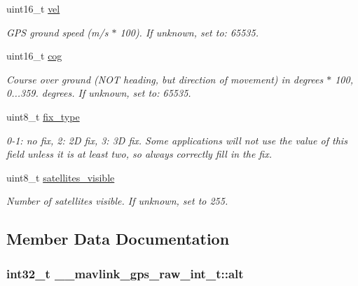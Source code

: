 \begin{DoxyCompactItemize}
uint16\+\_\+t \hyperlink{struct____mavlink__gps__raw__int__t_a77e8cbdbf554637e4fbbdaaabd562eaf}{vel}
\begin{DoxyCompactList}\small\item\em G\+P\+S ground speed (m/s $\ast$ 100). If unknown, set to\+: 65535. \end{DoxyCompactList}\item 
uint16\+\_\+t \hyperlink{struct____mavlink__gps__raw__int__t_adbe4dfbea17d1fd08a0841ce29e32637}{cog}
\begin{DoxyCompactList}\small\item\em Course over ground (N\+O\+T heading, but direction of movement) in degrees $\ast$ 100, 0...359. degrees. If unknown, set to\+: 65535. \end{DoxyCompactList}\item 
\hypertarget{struct____mavlink__gps__raw__int__t_ae014afb6eea2b6033ebde37c79e120f2}{uint8\+\_\+t \hyperlink{struct____mavlink__gps__raw__int__t_ae014afb6eea2b6033ebde37c79e120f2}{fix\+\_\+type}}\label{struct____mavlink__gps__raw__int__t_ae014afb6eea2b6033ebde37c79e120f2}

\begin{DoxyCompactList}\small\item\em 0-\/1\+: no fix, 2\+: 2\+D fix, 3\+: 3\+D fix. Some applications will not use the value of this field unless it is at least two, so always correctly fill in the fix. \end{DoxyCompactList}\item 
\hypertarget{struct____mavlink__gps__raw__int__t_af1481a191aa3ffbf832dc3a4c35cbf09}{uint8\+\_\+t \hyperlink{struct____mavlink__gps__raw__int__t_af1481a191aa3ffbf832dc3a4c35cbf09}{satellites\+\_\+visible}}\label{struct____mavlink__gps__raw__int__t_af1481a191aa3ffbf832dc3a4c35cbf09}

\begin{DoxyCompactList}\small\item\em Number of satellites visible. If unknown, set to 255. \end{DoxyCompactList}\end{DoxyCompactItemize}


\subsection{Member Data Documentation}
\hypertarget{struct____mavlink__gps__raw__int__t_a00fe92144cfdaf8440a841493e5b6e99}{
\subsubsection[{alt}]{\setlength{\rightskip}{0pt plus 5cm}int32\+\_\+t \+\_\+\+\_\+mavlink\+\_\+gps\+\_\+raw\+\_\+int\+\_\+t\+::alt}}\label{struct____mavlink__gps__raw__int__t_a00fe92144cfdaf8440a841493e5b6e99}


